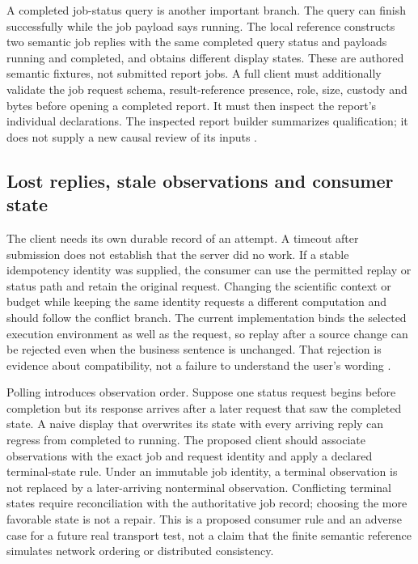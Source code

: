 A completed job-status query is another important branch. The query can
finish successfully while the job payload says running. The local reference
constructs two semantic job replies with the same completed query status
and payloads running and completed, and obtains different display states.
These are authored semantic fixtures, not submitted report jobs. A full
client must additionally validate the job request schema, result-reference
presence, role, size, custody and bytes before opening a completed report.
It must then inspect the report's individual declarations. The inspected
report builder summarizes qualification; it does not supply a new causal
review of its inputs \citep{exec13_i2_examples}.

\subsection{Lost replies, stale observations and consumer state}

The client needs its own durable record of an attempt. A timeout after
submission does not establish that the server did no work. If a stable
idempotency identity was supplied, the consumer can use the permitted replay
or status path and retain the original request. Changing the scientific
context or budget while keeping the same identity requests a different
computation and should follow the conflict branch. The current implementation
binds the selected execution environment as well as the request, so replay
after a source change can be rejected even when the business sentence is
unchanged. That rejection is evidence about compatibility, not a failure to
understand the user's wording \citep{exec13_i2_examples}.

Polling introduces observation order. Suppose one status request begins
before completion but its response arrives after a later request that saw
the completed state. A naive display that overwrites its state with every
arriving reply can regress from completed to running. The proposed client
should associate observations with the exact job and request identity and
apply a declared terminal-state rule. Under an immutable job identity, a
terminal observation is not replaced by a later-arriving nonterminal
observation. Conflicting terminal states require reconciliation with the
authoritative job record; choosing the more favorable state is not a repair.
This is a proposed consumer rule and an adverse case for a future real
transport test, not a claim that the finite semantic reference simulates
network ordering or distributed consistency.

